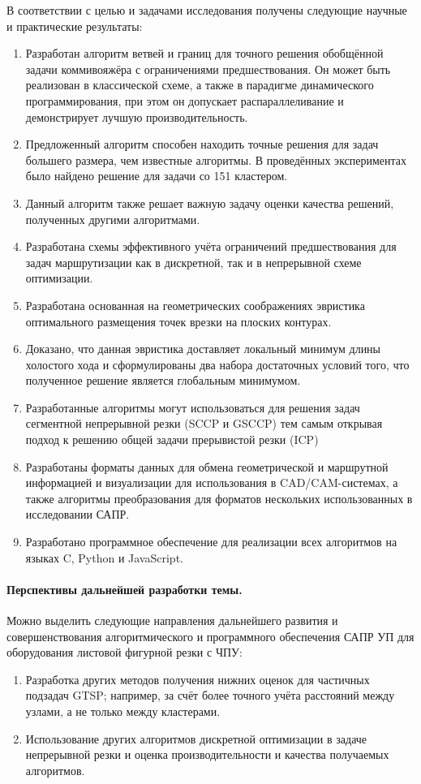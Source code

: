 В соответствии с целью и задачами исследования получены следующие
научные и практические результаты:

\begin{enumerate}
  \item
  Разработан алгоритм ветвей и границ для точного решения
  обобщённой задачи коммивояжёра с ограничениями предшествования.
  Он может быть реализован в классической схеме,
  а также в парадигме динамического программирования,
  при этом он допускает
  распараллеливание и демонстрирует лучшую производительность.
  \item
  Предложенный алгоритм способен находить точные решения для задач большего размера,
  чем известные алгоритмы.
  В проведённых экспериментах было найдено решение для
  задачи со 151 кластером.
  \item
  Данный алгоритм также решает важную задачу оценки качества
  решений, полученных другими алгоритмами.
  \item
  Разработана схемы эффективного учёта ограничений предшествования
  для задач маршрутизации как в дискретной,
  так и в непрерывной схеме оптимизации.
  \item
  Разработана основанная на геометрических соображениях эвристика
  оптимального размещения точек врезки на плоских контурах.
  \item
  Доказано, что данная эвристика доставляет локальный минимум длины холостого хода
  и сформулированы два набора достаточных условий того,
  что полученное решение является глобальным минимумом.
  \item
  Разработанные алгоритмы могут использоваться для
  решения задач сегментной непрерывной резки (SCCP и GSCCP)
  тем самым открывая подход к решению общей задачи прерывистой резки
  (ICP)
  \item
  Разработаны форматы данных для обмена геометрической и маршрутной
  информацией и визуализации для использования в CAD/CAM-системах,
  а также алгоритмы преобразования для форматов нескольких
  использованных в исследовании САПР.
  \item
  Разработано программное обеспечение для реализации всех алгоритмов
  на языках C, Python и JavaScript.
\end{enumerate}

\paragraph*{Перспективы дальнейшей разработки темы.}
Можно выделить следующие направления дальнейшего развития и совершенствования алгоритмического и
программного обеспечения САПР УП для оборудования листовой фигурной резки с ЧПУ:

\begin{enumerate}
    \item
    Разработка других методов получения нижних оценок для частичных подзадач GTSP;
    например, за счёт более точного учёта расстояний между узлами,
    а не только между кластерами.
    \item
    Использование других алгоритмов дискретной оптимизации в задаче
    непрерывной резки и оценка производительности и качества получаемых
    алгоритмов.
\end{enumerate}
